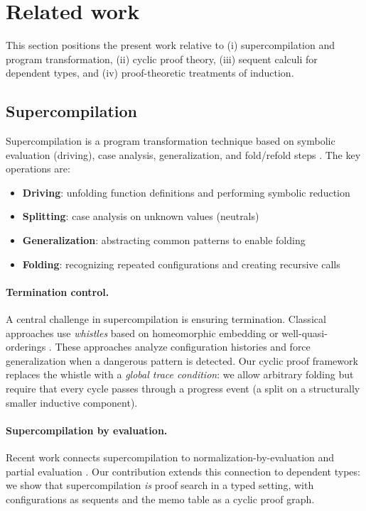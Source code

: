 \section{Related work}
\label{sec:related}

This section positions the present work relative to (i) supercompilation and program transformation, (ii) cyclic proof theory, (iii) sequent calculi for dependent types, and (iv) proof-theoretic treatments of induction.

\subsection{Supercompilation}

Supercompilation is a program transformation technique based on symbolic evaluation (driving), case analysis, generalization, and fold/refold steps \cite{turchin-1986-supercompiler,sorensen-gluck-1995-supercompilation}.
The key operations are:
\begin{itemize}
\item \textbf{Driving}: unfolding function definitions and performing symbolic reduction
\item \textbf{Splitting}: case analysis on unknown values (neutrals)
\item \textbf{Generalization}: abstracting common patterns to enable folding
\item \textbf{Folding}: recognizing repeated configurations and creating recursive calls
\end{itemize}

\paragraph{Termination control.}
A central challenge in supercompilation is ensuring termination. 
Classical approaches use \emph{whistles} based on homeomorphic embedding or well-quasi-orderings \cite{kruskal-1960-wqo,leuschel-2002-homeomorphic,sorensen-gluck-jones-1996-positive}.
These approaches analyze configuration histories and force generalization when a dangerous pattern is detected.
Our cyclic proof framework replaces the whistle with a \emph{global trace condition}: we allow arbitrary folding but require that every cycle passes through a progress event (a split on a structurally smaller inductive component).

\paragraph{Supercompilation by evaluation.}
Recent work connects supercompilation to normalization-by-evaluation and partial evaluation \cite{jonesbook-1996-partial-evaluation}.
Our contribution extends this connection to dependent types: we show that supercompilation \emph{is} proof search in a typed setting, with configurations as sequents and the memo table as a cyclic proof graph.


